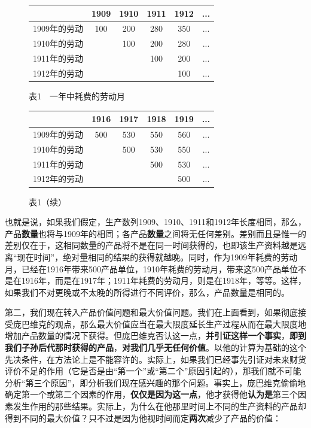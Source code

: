 \documentclass[fontset=fandol, a4paper, 12pt, openright]{ctexbook}
\begin{document}
\begin{figure}[htbp]
    \centering
    \begin{tabular}{c c c c c c}
        \hline
        & 1909 & 1910 & 1911 & 1912 & ... \\
        \hline
        1909年的劳动 & 100 & 200 & 280 & 350 & ... \\
        1910年的劳动 & & 100 & 200 & 280 & ... \\
        1911年的劳动 & & & 100 & 200 & ... \\
        1912年的劳动 & & & & 100 & ... \\
        \hline
    \end{tabular}
    \caption{表1　一年中耗费的劳动月}
\end{figure}

\begin{figure}[htbp]
    \centering
    \begin{tabular}{c c c c c c}
        \hline
        & 1916 & 1917 & 1918 & 1919 & ... \\
        \hline
        1909年的劳动 & 500 & 530 & 550 & 560 & ... \\
        1910年的劳动 & & 500 & 530 & 550 & ... \\
        1911年的劳动 & & & 500 & 530 & ... \\
        1912年的劳动 & & & & 500 & ... \\
        \hline
    \end{tabular}
    \caption{表1（续）}
\end{figure}

也就是说，如果我们假定，生产数列1909、1910、1911和1912年长度相同，那么，产品\textbf{数量}也将与1909年的相同；各产品\textbf{数量}之间将无任何差别。差别而且是惟一的差别仅在于，这相同数量的产品将不是在同一时间获得的，也即该生产资料越是远离“现在时间”，绝对量相同的结果的获得就越晚。同时，作为1909年耗费的劳动月，已经在1916年带来500产品单位，1910年耗费的劳动月，带来这500产品单位不是在1916年，而是在1917年；1911年耗费的劳动月，则是在1918年，等等。这样，如果我们不对更晚或不太晚的所得进行不同评价，那么，产品数量是相同的。

第二，我们现在转入产品价值问题和最大价值问题。我们在上面看到，如果彻底接受庞巴维克的观点，那么最大价值应当在最大限度延长生产过程从而在最大限度地增加产品数量的情况下获得。但庞巴维克否认这一点，\textbf{并引证这样一个事实}，\textbf{即到我们子孙后代那时获得的产品}，\textbf{对我们几乎无任何价值}。以他的计算为基础的这个先决条件，在方法论上是不能容许的。实际上，如果我们已经事先引证对未来财货评价不足的作用（它是否是由“第一个”或“第二个”原因引起的），那我们就不可能分析“第三个原因”，即分析我们现在感兴趣的那个问题。事实上，庞巴维克偷偷地确定第一个或第二个因素的作用，\textbf{仅仅是因为这一点}，他才获得他\textbf{认为是}第三个因素发生作用的那些结果。实际上，为什么在他那里时间上不同的生产资料的产品却得到不同的最大价值？只不过是因为他视时间而定\textbf{两次}减少了产品的价值：
\end{document}

